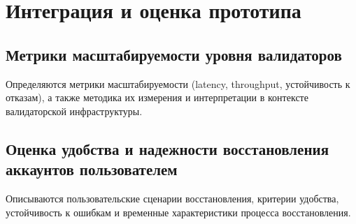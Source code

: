 \chapter{Интеграция и оценка прототипа}\label{ch:ch6}

\section{Метрики масштабируемости уровня валидаторов}\label{sec:ch6/sec1}

Определяются метрики масштабируемости (latency, throughput, устойчивость к
отказам), а также методика их измерения и интерпретации в контексте
валидаторской инфраструктуры.

\section{Оценка удобства и надежности восстановления аккаунтов пользователем}\label{sec:ch6/sec2}

Описываются пользовательские сценарии восстановления, критерии удобства,
устойчивость к ошибкам и временные характеристики процесса восстановления.
